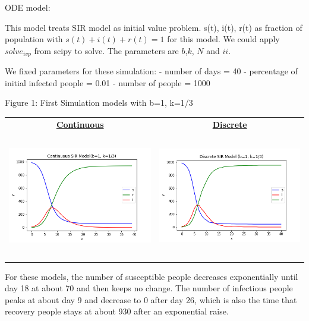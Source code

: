 \documentclass[11pt,a4paper]{article}
\begin{document}
\medskip \noindent
ODE model:

\medskip \noindent
This model treats SIR model as initial value problem. s(t), i(t), r(t) as fraction of population with $s(t)+i(t)+r(t)=1$ for this model. We could apply $solve_{ivp}$ from scipy to solve. The parameters are $b$,$k$, $N$ and $ii$.

\medskip \noindent
We fixed parameters for these simulation:
\newline
- number of days = 40
\newline
- percentage of initial infected people = 0.01
\newline
- number of people = 1000

\newpage
  \begin{center}
 	Figure 1: First Simulation models with b=1, k=1/3
 \end{center}

 \begin{center}
 	
 	\begin{tabular}{c c}
 		\textbf{\underline{Continuous}} &
 		\textbf{\underline{Discrete}} \\
 		\includegraphics[width=7cm, height=5.5cm]{C_SIR_1.png} & \includegraphics[width=7cm,height=5.5cm]{D_SIR_2.png}
 	\end{tabular}
 
 \end{center}

\medskip \noindent
For these models, the number of susceptible people decreases exponentially until day 18 at about 70 and then keeps no change. The number of infectious people peaks at about day 9 and decrease to 0 after day 26, which is also the time that recovery people stays at about 930 after an exponential raise. 
\end{document}

